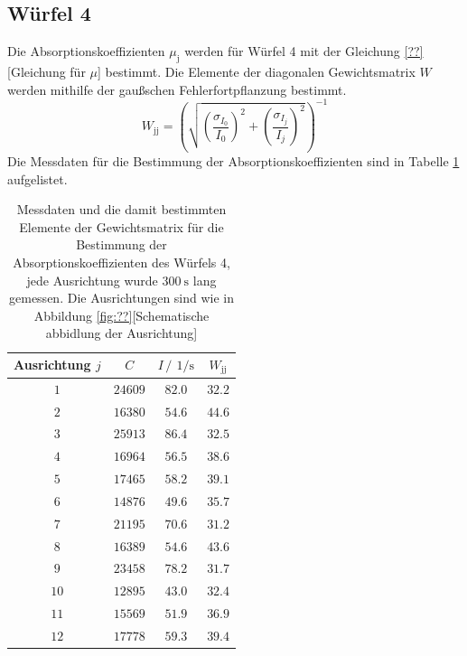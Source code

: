 \subsection{Würfel 4}
Die Absorptionskoeffizienten $\mu_{\text{j}}$ werden für Würfel 4 mit der Gleichung \eqref{??}[Gleichung für $\mu$] bestimmt.
Die Elemente der diagonalen Gewichtsmatrix $W$ werden mithilfe der gaußschen Fehlerfortpflanzung bestimmt.
\begin{equation*}
    W_{\text{jj}}= \left(\sqrt{\left(\frac{\sigma_{I_0}}{I_0}\right)^2+ \left(\frac{\sigma_{I_j}}{I_j}\right)^2}\right)^{-1}
\end{equation*}
Die Messdaten für die Bestimmung der Absorptionskoeffizienten sind in Tabelle \ref{tab:Messdaten_Würfel4} aufgelistet.
\FloatBarrier
\begin{table}
    \centering
    \caption{Messdaten und die damit bestimmten Elemente der Gewichtsmatrix für die Bestimmung der Absorptionskoeffizienten des Würfels 4, jede Ausrichtung wurde $\SI{300}{\second}$ lang gemessen. Die Ausrichtungen sind wie in Abbildung \ref{fig:??}[Schematische abbidlung der Ausrichtung]}
    \label{tab:Messdaten_Würfel4}
    \begin{tabular}{c c c c}
        \toprule
        Ausrichtung $j$&$C$&$I\,/\,\SI{}{1\per\second}$&$W_{\text{jj}}$\\
        \midrule
        $\num{1}$&$\num{24609}$&$\num{82.0}$ &$\num{32.2}$\\
        $\num{2}$&$\num{16380}$&$\num{54.6}$ &$\num{44.6}$\\
        $\num{3}$&$\num{25913}$&$\num{86.4}$ &$\num{32.5}$\\
        $\num{4}$&$\num{16964}$&$\num{56.5}$ &$\num{38.6}$\\
        $\num{5}$&$\num{17465}$&$\num{58.2}$ &$\num{39.1}$\\
        $\num{6}$&$\num{14876}$&$\num{49.6}$ &$\num{35.7}$\\
        $\num{7}$&$\num{21195}$&$\num{70.6}$ &$\num{31.2}$\\
        $\num{8}$&$\num{16389}$&$\num{54.6}$ &$\num{43.6}$\\
        $\num{9}$&$\num{23458}$&$\num{78.2}$ &$\num{31.7}$\\
        $\num{10}$&$\num{12895}$&$\num{43.0}$&$\num{32.4}$\\
        $\num{11}$&$\num{15569}$&$\num{51.9}$&$\num{36.9}$\\
        $\num{12}$&$\num{17778}$&$\num{59.3}$&$\num{39.4}$\\
        \bottomrule
    \end{tabular}
\end{table}
\FloatBarrier